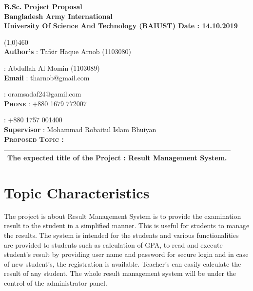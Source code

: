 \documentclass{article}
\begin{document}
	\begin{titlepage}
	\textbf{\large \textbf{B.Sc. Project Proposal}}\\
	
	
	\textbf{\large Bangladesh Army International }\\
	
	\textbf{\large University Of Science And Technology (BAIUST) \hspace{50pt} Date : 14.10.2019}
	
	\line(1,0){460}	 \\
	
	
	\large \textbf{Author’s} \hspace{.5cm}     : Tafsir Haque Arnob                      (1103080) 
	
	{\large \hspace{2.6cm}: Abdullah Al Momin  (1103089)}\\
	
	{\large \textbf{Email} \hspace{1.1cm} : tharnob@gmail.com }
	
	{\large \hspace{2.5cm} :   oramsadaf24@gamil.com}\\
	
	
	
	\textsc{\large \textbf{Phone} \hspace{1cm} : +880 1679 772007}
	
	\textsc{\large \hspace{2.5cm} : +880 1757 001400}\\
	
	{\large \textbf{Supervisor} \hspace{0.05cm} : Mohammad Robaitul Islam Bhuiyan} \\
	
	\textsc{\large \textbf{Proposed Topic :}}\\
	
	\begin{tabular}{|c|}
		\hline
		\textbf{The expected title of the Project :}  Result Management System.\\
		\hline
	
	
	\end{tabular}		
	
	
	
	
\section{Topic Characteristics}\label{sec intro}
The project is about Result Management System is to provide the examination result to the student in a simplified manner. This is useful for students to manage the results. 
The system is intended for the students and various functionalities are provided to students such as calculation of GPA, to read and execute student’s result by providing user name and password for secure login and in case of new student’s, the registration is available. Teacher’s  can easily calculate  the result  of any student. The whole result management system will be under the control of the administrator panel. 



\end{titlepage}
\end{document}
